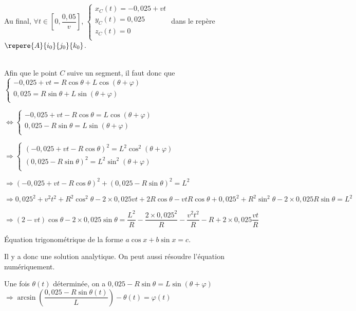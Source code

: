 Au final, $\forall t \in \left[0,\dfrac{0,05}{v}\right]$, $\left\{
\begin{array}{l}
x_C(t)= -0,025+vt\\
y_C(t)= 0,025\\
z_C(t)= 0\\
\end{array}
\right.
$ dans le repère $\repere{A}{i_0}{j_0}{k_0}$.


\else
\fi

\ifprof ~\\
Afin que le point $C$ suive un segment, il faut donc que 
$\left\{
\begin{array}{l}
-0,025+vt= R\cos\theta  +L\cos\left(\theta+\varphi\right)  \\
0,025 = R \sin\theta + L\sin\left(\theta+\varphi\right)\\
\end{array}
\right.
$

$\Leftrightarrow 
\left\{
\begin{array}{l}
-0,025+vt- R\cos\theta  =L\cos\left(\theta+\varphi\right)  \\
0,025 - R \sin\theta  = L\sin\left(\theta+\varphi\right)\\
\end{array}
\right.
$

$\Rightarrow 
\left\{
\begin{array}{l}
\left(-0,025+vt- R\cos\theta\right)^2  =L^2\cos^2\left(\theta+\varphi\right)  \\
\left(0,025 - R \sin\theta  \right)^2= L^2\sin^2\left(\theta+\varphi\right)\\
\end{array}
\right.
$

$\Rightarrow 
\left(-0,025+vt- R\cos\theta\right)^2  + \left(0,025 - R \sin\theta  \right)^2 = L^2
$

$\Rightarrow 
0,025^2+v^2t^2+R^2\cos^2\theta -2\times 0,025 vt+2R\cos\theta-vtR\cos\theta
  + 0,025^2 + R^2 \sin^2\theta -2\times 0,025 R \sin\theta  =      L^2
$

$\Rightarrow 
\left(2-vt\right)\cos\theta  -2\times 0,025  \sin\theta  =      \dfrac{L^2}{R} - \dfrac{2\times0,025^2}{R}-\dfrac{v^2t^2}{R}-R +2\times 0,025 \dfrac{vt}{R}
$


Équation trigonométrique de la forme $a\cos x  + b\sin x =c$.

Il y a donc une solution analytique. On peut aussi résoudre l'équation numériquement.


Une fois $\theta(t)$ déterminée, on a $0,025 - R \sin\theta  = L\sin\left(\theta+\varphi\right)$ 
$\Rightarrow \arcsin\left(\dfrac{0,025 - R \sin\theta(t)}{L}\right)  - \theta(t) = \varphi(t)$

\else
\fi


\ifprof
\else
\fi


\ifprof
\else
{}
\fi